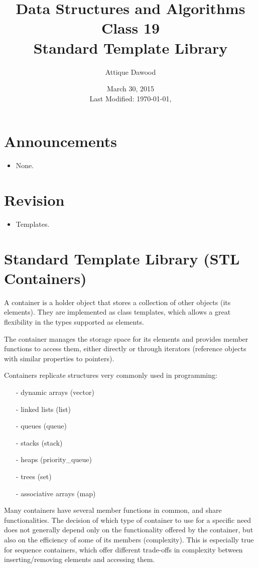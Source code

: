 \documentclass[12pt,a4paper]{article}
\title{Data Structures and Algorithms\\Class 19\\Standard Template Library}
\author{Attique Dawood}
\date{March 30, 2015\\[0.2cm] Last Modified: \today, \currenttime}
\begin{document}
\maketitle
\section{Announcements}
\begin{itemize}
\item None.
\end{itemize}
\section{Revision}
\begin{itemize}
\item Templates.
\end{itemize}
\section{Standard Template Library (STL Containers)}
A container is a holder object that stores a collection of other objects (its elements). 
They are implemented as class templates, which allows a great flexibility in the types supported as elements.

The container manages the storage space for its elements and provides member functions to access them,
either directly or through iterators (reference objects with similar properties to pointers).

Containers replicate structures very commonly used in programming:
\begin{itemize}
\item[-] dynamic arrays (vector)
\item[-] linked lists (list)
\item[-] queues (queue)
\item[-] stacks (stack)
\item[-] heaps (priority\_queue)
\item[-] trees (set)
\item[-] associative arrays (map)
\end{itemize}
Many containers have several member functions in common, and share functionalities.
The decision of which type of container to use for a specific need does not generally depend only on the
functionality offered by the container, but also on the efficiency of some of its members (complexity).
This is especially true for sequence containers, which offer different trade-offs in complexity between
inserting/removing elements and accessing them.
\end{document}
